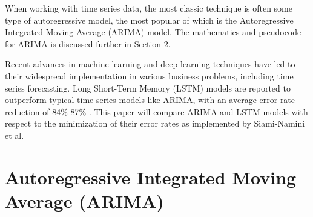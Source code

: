 \documentclass[twoside,11pt]{article}
\begin{document}
When working with time series data, the most classic technique is often some type of autoregressive model, the most popular of which is the Autoregressive Integrated Moving Average (ARIMA) model. The mathematics and pseudocode for ARIMA is discussed further in \hyperref[sec:arima]{Section 2}.

Recent advances in machine learning and deep learning techniques have led to their widespread implementation in various business problems, including time series forecasting. Long Short-Term Memory (LSTM) models are reported to outperform typical time series models like ARIMA, with an average error rate reduction of 84\%-87\% \citep{siami-namini:2018}. This paper will compare ARIMA and LSTM models with respect to the minimization of their error rates as implemented by Siami-Namini et al. 

\newpage
\section{Autoregressive Integrated Moving Average (ARIMA)}
\label{sec:arima}
\end{document}
